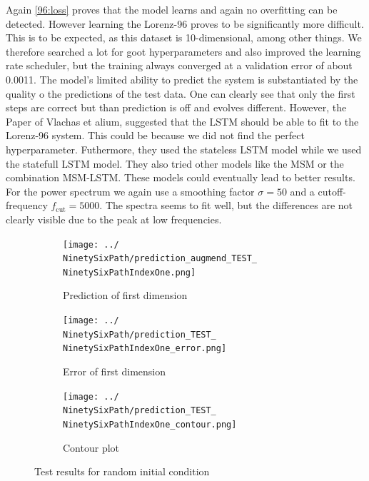 	Again \cref{96:loss} proves that the model learns and again no overfitting can be detected. However learning the Lorenz-96 proves to be significantly more difficult. This is to be expected, as this dataset is 10-dimensional, among other things. We therefore searched a lot for goot hyperparameters and also improved the learning rate scheduler, but the training always converged at a validation error of about 0.0011. The model's limited ability to predict the system is substantiated by the quality o the predictions of the test data. One can clearly see that only the first steps are correct but than prediction is off and evolves different. However, the Paper of Vlachas et alium, suggested that the LSTM should be able to fit to the Lorenz-96 system. This could be because we did not find the perfect hyperparameter. Futhermore, they used the stateless LSTM model while we used the statefull LSTM model. They also tried other models like the MSM or the combination MSM-LSTM. These models could eventually lead to better results. For the power spectrum we again use a smoothing factor $\sigma=50$ and a cutoff-frequency $f_{\text{cut}}=5000$. The spectra seems to fit well, but the differences are not clearly visible due to the peak at low frequencies.
	
	\begin{figure}[h]
		\centering
		\begin{subfigure}[b]{0.45\textwidth}
			\texttt{[image: ../\\NinetySixPath/prediction\_augmend\_TEST\_\\NinetySixPathIndexOne.png]}
			\caption{Prediction of first dimension}
		\end{subfigure}
		\begin{subfigure}[b]{0.45\textwidth}
			\texttt{[image: ../\\NinetySixPath/prediction\_TEST\_\\NinetySixPathIndexOne\_error.png]}
			\caption{Error of first dimension}
		\end{subfigure}
		\begin{subfigure}[b]{\textwidth}
			\texttt{[image: ../\\NinetySixPath/prediction\_TEST\_\\NinetySixPathIndexOne\_contour.png]}
			\caption{Contour plot}
		\end{subfigure}
		\caption{Test results for random initial condition \NinetySixPathIndexOne}
		\label{96:predictions1}
	\end{figure}

